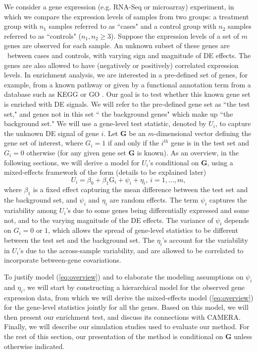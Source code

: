 	We consider a gene expression (e.g. RNA-Seq or microarray) experiment, in which we compare the 
	expression levels of samples from two groups: a treatment group with $n_1$ samples referred to 
	as ``cases" and a control group with $n_2$ samples referred to as ``controls" ($n_1,n_2\ge 3$). 
	Suppose the expression levels of a set of $m$ genes are observed for each sample. An unknown 
	subset of these genes are \DED~between cases and controls, with varying sign and magnitude of 
	DE effects. The genes are also allowed to have (negatively or positively) correlated expression 
	levels. In enrichment analysis, we are interested in a pre-defined set of genes, for example, 
	from a known pathway or given by a functional annotation term from a database such as KEGG
	\citep{kanehisa2000kegg} or GO \citep{ashburner2000gene}. Our goal is to test whether this known
	gene set is enriched with DE signals. We will refer to the pre-defined gene set as ``the test 
	set," and genes not in this set `` the background genes" which make up ``the background set."
	 We will use a gene-level test statistic, denoted by $U_i$, to capture the unknown DE signal of 
	 gene $i$. Let $\bm G$ be an $m$-dimensional vector defining the gene set of interest, where 
	 $G_i=1$ if and only if the $i^{th}$ gene is in the test set and $G_i=0$ otherwise (for any 
	 given gene set $\bm G$ is known). As an overview, in the 
	following sections, we will derive a model for $ U_i$'s conditional on 
	$\bm G$, using a mixed-effects framework of the form (details to be explained later)
		\begin{equation}\label{eq:overview}
		U_i = \beta_0 + \beta_1\text{G}_i  + \psi_i  + \eta_i, ~i = 1, \ldots, m,  
		\end{equation}
	where $\beta_1$ is a fixed effect capturing the mean difference between the test set and the 
	background set, and $\psi_i$ and $\eta_i$ are random effects. The term $\psi_i$ captures the 
	variability among $U_i$'s due to some genes being differentially expressed and some not, and to 
	the varying magnitude of the DE effects.
	 The variance of $\psi_i$ depends on $G_i=0$ or $1$, which allows the spread of gene-level 
	 statistics to be different between the test set and the background set. The $\eta_i$'s account 
	 for the variability in $U_i$'s due to the across-sample variability, and are allowed to be 
	 correlated to incorporate between-gene covariations.
		
	 To justify model (\ref{eq:overview}) and to elaborate the modeling 
	 assumptions on $\psi_i$ 
	 and $\eta_i$, we will start by constructing a hierarchical model for the observed gene 
	 expression data, from which we will derive the mixed-effects model (\ref{eq:overview}) for the 
	 gene-level statistics jointly for all the genes. Based on this model, we will then present our 
	 enrichment test, and 
	discuss its connections with CAMERA. Finally, we will describe our simulation studies used to 
	evaluate our method. For the rest of this section, our presentation of the method is 
	conditional on $\bm G$ unless otherwise indicated.
	
